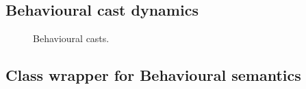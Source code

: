 \documentclass[acmlarge, anonymous, authordraft]{acmart}
\begin{document}
\begin{mathpar}
\end{mathpar}

\subsection{Behavioural cast dynamics}

\begin{figure}[!ht]
\vspace{-2mm}

{  
  \begin{mathpar}
  

\end{mathpar}}  

\vspace{-2mm}
\caption{Behavioural casts.}\label{behaves}
\end{figure}


\subsection{Class wrapper for Behavioural semantics}\label{wrap}
\end{document}

